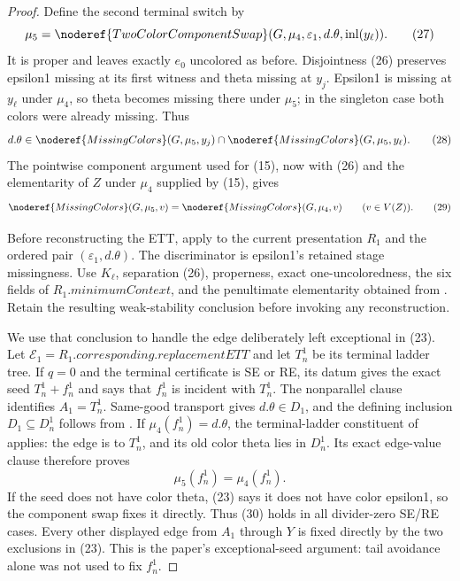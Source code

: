 \begin{proof}
Define the second terminal switch by
\[
 \mu _5=\noderef{TwoColorComponentSwap}
   (G,\mu _4,\varepsilon _1,d.\theta,
      \operatorname{inl}(y_\ell)).                            \tag{27}
\]
It is proper and leaves exactly $e_0$ uncolored as before.
Disjointness (26) preserves epsilon1 missing at its first witness and
theta missing at $y_j$.  Epsilon1 is missing at $y_\ell$ under
$\mu _4$, so theta becomes missing there under $\mu _5$; in the
singleton case both colors were already missing.  Thus
\[
 d.\theta\in\noderef{MissingColors}(G,\mu _5,y_j)
       \cap\noderef{MissingColors}(G,\mu _5,y_\ell).           \tag{28}
\]
The pointwise component argument used for (15), now with (26) and the
elementarity of $Z$ under $\mu _4$ supplied by (15), gives
\[
 \noderef{MissingColors}(G,\mu _5,v)
   =\noderef{MissingColors}(G,\mu _4,v)\qquad(v\in V(Z)).      \tag{29}
\]

Before reconstructing the ETT, apply
 to the current presentation $R_1$ and
the ordered pair $(\varepsilon _1,d.\theta)$.  The discriminator is
epsilon1's retained stage missingness.  Use $K_\ell$, separation (26),
properness, exact one-uncoloredness, the six fields of
$R_1.\mathit{minimumContext}$, and the penultimate elementarity obtained
from .  Retain the
resulting weak-stability conclusion before invoking any reconstruction.

We use that conclusion to handle the edge deliberately left exceptional
in (23).  Let
$\mathcal E_1=R_1.\mathit{corresponding.replacementETT}$ and let
$T_n^1$ be its terminal ladder tree.  If $q=0$ and the terminal
certificate is SE or RE, its  datum
gives the exact seed $T_n^1+f_n^1$ and says that $f_n^1$ is incident
with $T_n^1$.  The nonparallel  clause identifies
$A_1=T_n^1$.  Same-good transport gives
$d.\theta\in D_1$, and the defining inclusion
$D_1\subseteq D_n^1$ follows from
.  If
$\mu _4(f_n^1)=d.\theta$, the terminal-ladder
 constituent of
 applies: the edge is
 to $T_n^1$, and its old color theta lies in
$D_n^1$.  Its exact edge-value clause therefore proves
\[
                         \mu _5(f_n^1)=\mu _4(f_n^1).          \tag{30}
\]
If the seed does not have color theta, (23) says it does not have color
epsilon1, so the component swap fixes it directly.  Thus (30) holds in
all divider-zero SE/RE cases.  Every other displayed edge from $A_1$
through $Y$ is fixed directly by the two exclusions in (23).  This is
the paper's exceptional-seed argument: tail avoidance alone was not used
to fix $f_n^1$.


\end{proof}
